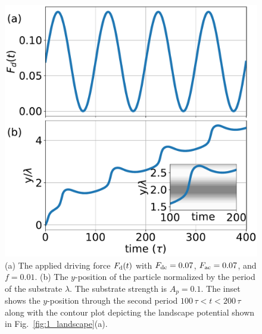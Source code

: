 \documentclass[preprint,showpacs,preprintnumbers,amsmath,amssymb,aps,prb]{revtex4-1}
\theoremstyle{remark}
\begin{document}
\begin{figure}[h]
\centering
\includegraphics[width=\columnwidth]{fig2_Fd_vy_time.pdf}
\caption{(a) The applied driving force $F_{\rm d}(t)$ 
  with  $F_{\rm dc} = 0.07$, $F_{\rm ac} = 0.07$, and $f=0.01$.
  (b) 
  The $y$-position of the  particle
  normalized by the period of the substrate $\lambda$.
  The substrate strength is $A_p=0.1$.
  The inset   shows
  the $y$-position
  through the second period $100\,\tau<t<200\,\tau$
 along with the contour plot depicting
  the landscape potential shown in Fig.~\ref{fig:1_landscape}(a).
  }
\label{fig:2_Fd_vy_time}
\end{figure}
\end{document}
